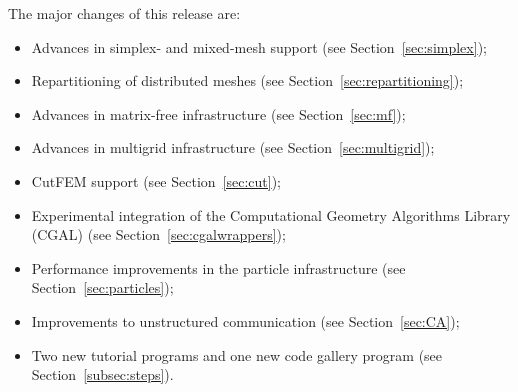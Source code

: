 \documentclass{ansarticle-preprint}
\begin{document}
The major changes of this release are:
%
\begin{itemize}
  \item Advances in simplex- and mixed-mesh support (see Section~\ref{sec:simplex});
  \item Repartitioning of distributed meshes (see Section~\ref{sec:repartitioning});
  \item Advances in matrix-free infrastructure (see Section~\ref{sec:mf});
  \item Advances in multigrid infrastructure (see Section~\ref{sec:multigrid});
  \item CutFEM support (see Section~\ref{sec:cut});
  \item Experimental integration of the Computational Geometry Algorithms Library (CGAL) (see Section~\ref{sec:cgalwrappers});
  \item Performance improvements in the particle infrastructure (see Section~\ref{sec:particles});
  \item Improvements to unstructured communication (see Section~\ref{sec:CA});
  \item Two new tutorial programs and one new code gallery program (see
    Section~\ref{subsec:steps}).
\end{itemize}
%
\end{document}
